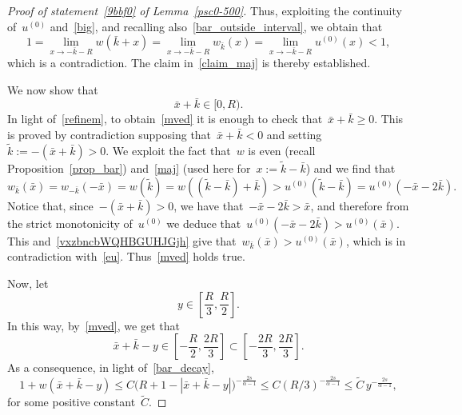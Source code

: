 \documentclass[10pt,a4paper]{amsart}
\numberwithin{equation}{section}
\begin{document}
\begin{proof}[Proof of statement~\eqref{9bbf0} of Lemma~\eqref{psc0-500}]
Thus, exploiting the continuity of~$u^{(0)}$ and~\eqref{big}, 
and recalling also~\eqref{bar_outside_interval},
we obtain that
\begin{equation*}
1 =\lim_{x \to -\bar{k}-R} w({\bar{k}}+x)
= \lim_{x \to -\bar{k}-R} w_{\bar{k}}(x) 
=  \lim_{x \to -\bar{k}-R} u^{(0)}(x)<1,
\end{equation*}
which is a contradiction. The claim in~\eqref{claim_maj}
is thereby established.

We now show that
\begin{equation}\label{mved}
\bar{x}+\bar{k} \in [0, R).
\end{equation}
In light of~\eqref{refinem}, to obtain~\eqref{mved} it is enough to check that~$\bar{x}+\bar{k}\geq 0 $. 
This is proved by contradiction supposing that~$\bar{x}+\bar{k}<0$
and setting~$\widetilde{k}:=-(\bar{x}+\bar{k})>0$. We exploit the fact that~$w$ is even
(recall Proposition~\ref{prop_bar})
and~\eqref{maj} (used here for~$x:=\widetilde{k}-\bar k$)
and we find that
\begin{equation}\label{vxzbncbWQHBGUHJGjh}
w_{\bar{k}}(\bar{x})= w_{-\bar{k}}(-\bar{x})= w(\widetilde{k}) 
=w((\widetilde{k}-\bar k) +\bar k)> u^{(0)}(\widetilde{k}- \bar k)
= u^{(0)}(-\bar{x}-2\bar k).
\end{equation}
Notice that, since~$-(\bar{x}+\bar{k})>0$, we have that~$-\bar{x}-2\bar k>\bar x$, and therefore from the strict monotonicity of~$u^{(0)}$ we deduce that~$u^{(0)}(-\bar{x}-2\bar k)>
u^{(0)}(\bar{x})$. This and~\eqref{vxzbncbWQHBGUHJGjh}
give that~$w_{\bar{k}}(\bar{x})>u^{(0)}(\bar{x})$,
which is in contradiction with~\eqref{eu}. Thus~\eqref{mved} holds true.

Now, let
\begin{equation}\label{y_range}
y \in \left[\frac{R}{3}, \frac{R}{2}\right].
\end{equation}
In this way, by~\eqref{mved}, we get that
\begin{equation*}
\bar{x}+\bar{k}-y \in \left[  - \frac{R}{2} ,\frac{2R}{3}  \right] \subset \left[-\frac{2R}{3}  ,\frac{2R}{3}\right].
\end{equation*}
As a consequence, in light of~\eqref{bar_decay},
\begin{equation}\label{est_guz}
1+ w(\bar{x}+\bar{k}-y ) \leq C \big(R+1-|\bar{x}+\bar{k}-y | \big)^{-\frac{2s}{\alpha-1}}\leq C (R/3)^{-\frac{2s}{\alpha-1}} \leq \widetilde{C} \, y^{-\frac{2s}{\alpha-1}},
\end{equation}
for some positive constant~$\widetilde{C}$.


\end{proof}
\end{document}

